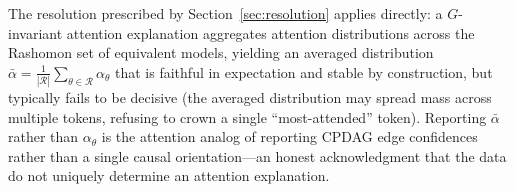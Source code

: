 The resolution prescribed by Section~\ref{sec:resolution} applies directly:
a $G$-invariant attention explanation aggregates attention distributions
across the Rashomon set of equivalent models, yielding an averaged
distribution $\bar{\alpha} = \frac{1}{|\mathcal{R}|}\sum_{\theta \in \mathcal{R}} \alpha_\theta$
that is faithful in expectation and stable by construction, but typically
fails to be decisive (the averaged distribution may spread mass across
multiple tokens, refusing to crown a single ``most-attended'' token).
Reporting $\bar{\alpha}$ rather than $\alpha_{\theta}$ is the attention
analog of reporting CPDAG edge confidences rather than a single causal
orientation---an honest acknowledgment that the data do not uniquely
determine an attention explanation.
